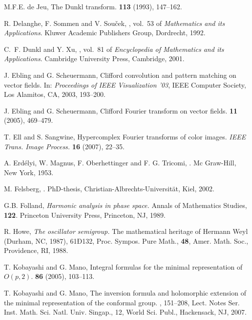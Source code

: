 \documentclass{amsart}
\theoremstyle{remark}
\begin{document}
\begin{thebibliography}{99}
M.F.E. de Jeu,
\newblock The Dunkl transform. 
 {\bf 113} (1993), 147--162.

R. Delanghe, F. Sommen and V. Sou{\v{c}}ek,
, vol.~53 of {\em
  Mathematics and its Applications}.
\newblock Kluwer Academic Publishers Group, Dordrecht, 1992.

C.~F. Dunkl and Y. Xu,
, vol.~81 of 
{ \em Encyclopedia of Mathematics and its Applications}.
\newblock Cambridge University Press, Cambridge, 2001.

J. Ebling and G. Scheuermann,
\newblock Clifford convolution and pattern matching on vector fields.
\newblock In: {\em Proceedings of IEEE Visualization '03}, IEEE Computer Society, Los Alamitos, CA, 2003, 193--200.

J. Ebling and G. Scheuermann,
\newblock Clifford Fourier transform on vector fields.
 {\bf 11} (2005), 469--479.

T. Ell and S. Sangwine,
Hypercomplex Fourier transforms of color images. 
{\em IEEE Trans. Image Process.} {\bf 16} (2007), 22--35. 

A. Erd\'elyi, W. Magnus, F. Oberhettinger and F. G. Tricomi,
.
\newblock Mc Graw-Hill, New York, 1953.

M. Felsberg,
.
\newblock PhD-thesis, Christian-Albrechts-Universit\"at, Kiel, 2002.

G.B. Folland,
{\em Harmonic analysis in phase space.}
Annals of Mathematics Studies, {\bf 122}. Princeton University Press, Princeton, NJ, 1989.

R. Howe,
{\em The oscillator semigroup.} The mathematical heritage of Hermann Weyl (Durham, NC, 1987), 61Ð132,
Proc. Sympos. Pure Math., {\bf 48}, Amer. Math. Soc., Providence, RI, 1988. 

T. Kobayashi and G. Mano,
\newblock Integral formulas for the minimal representation of $O(p,2)$. 
 {\bf 86} (2005), 103--113. 

T. Kobayashi and G. Mano,
\newblock The inversion formula and holomorphic extension of the minimal representation of the conformal group.
, 151--208,
Lect. Notes Ser. Inst. Math. Sci. Natl. Univ. Singap., 12, World Sci. Publ., Hackensack, NJ, 2007. 


\end{thebibliography}
\end{document}
